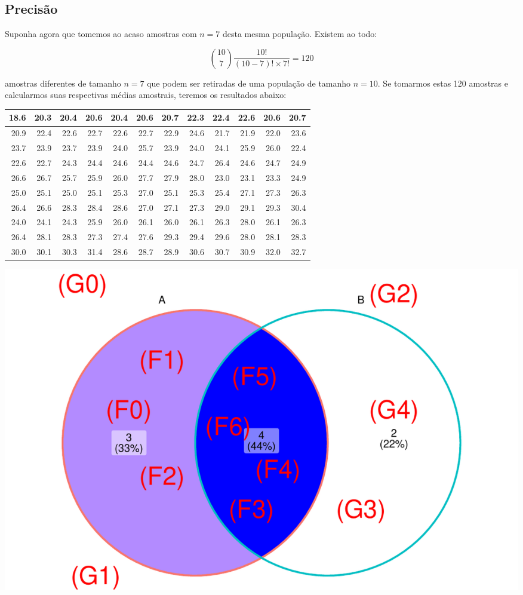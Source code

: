 \documentclass[
]{book}
\begin{document}
\hypertarget{precisuxe3o}{%
\subsection{Precisão}\label{precisuxe3o}}

Suponha agora que tomemos ao acaso amostras com \(n = 7\) desta mesma população. Existem ao todo:

\[{{10}\choose{7}} \frac{10!}{(10-7)! \times 7!} = 120\]

amostras diferentes de tamanho \(n = 7\) que podem ser retiradas de uma população de tamanho \(n = 10\). Se tomarmos estas 120 amostras e calcularmos suas respectivas médias amostrais, teremos os resultados abaixo:

\begin{tabular}{r|r|r|r|r|r|r|r|r|r|r|r}
\hline
18.6 & 20.3 & 20.4 & 20.6 & 20.4 & 20.6 & 20.7 & 22.3 & 22.4 & 22.6 & 20.6 & 20.7\\
\hline
20.9 & 22.4 & 22.6 & 22.7 & 22.6 & 22.7 & 22.9 & 24.6 & 21.7 & 21.9 & 22.0 & 23.6\\
\hline
23.7 & 23.9 & 23.7 & 23.9 & 24.0 & 25.7 & 23.9 & 24.0 & 24.1 & 25.9 & 26.0 & 22.4\\
\hline
22.6 & 22.7 & 24.3 & 24.4 & 24.6 & 24.4 & 24.6 & 24.7 & 26.4 & 24.6 & 24.7 & 24.9\\
\hline
26.6 & 26.7 & 25.7 & 25.9 & 26.0 & 27.7 & 27.9 & 28.0 & 23.0 & 23.1 & 23.3 & 24.9\\
\hline
25.0 & 25.1 & 25.0 & 25.1 & 25.3 & 27.0 & 25.1 & 25.3 & 25.4 & 27.1 & 27.3 & 26.3\\
\hline
26.4 & 26.6 & 28.3 & 28.4 & 28.6 & 27.0 & 27.1 & 27.3 & 29.0 & 29.1 & 29.3 & 30.4\\
\hline
24.0 & 24.1 & 24.3 & 25.9 & 26.0 & 26.1 & 26.0 & 26.1 & 26.3 & 28.0 & 26.1 & 26.3\\
\hline
26.4 & 28.1 & 28.3 & 27.3 & 27.4 & 27.6 & 29.3 & 29.4 & 29.6 & 28.0 & 28.1 & 28.3\\
\hline
30.0 & 30.1 & 30.3 & 31.4 & 28.6 & 28.7 & 28.9 & 30.6 & 30.7 & 30.9 & 32.0 & 32.7\\
\hline
\end{tabular}

\begin{center}\includegraphics{probest-cambientais_files/figure-latex/unnamed-chunk-183-1} \end{center}
\end{document}
